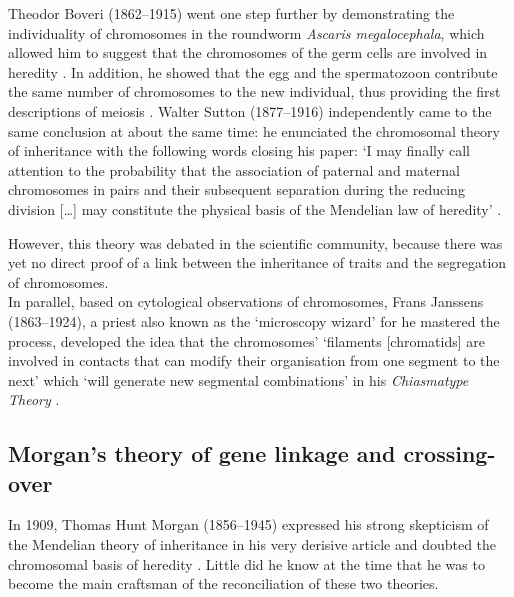 Theodor Boveri (1862--1915) went one step further by demonstrating the individuality of chromosomes in the roundworm \textit{Ascaris megalocephala}, which allowed him to suggest that the chromosomes of the germ cells are involved in heredity \citep{boveri1888zellen}.
In addition, he showed that the egg and the spermatozoon contribute the same number of chromosomes to the new individual, thus providing the first descriptions of meiosis \citep{boveri1890zellen}.
Walter Sutton (1877--1916) independently came to the same conclusion at about the same time: he enunciated the chromosomal theory of inheritance with the following words closing his  paper: ‘I may finally call attention to the probability that the association of paternal and maternal chromosomes in pairs and their subsequent separation during the reducing division […] may constitute the physical basis of the Mendelian law of heredity’ \citep{sutton1902morphology}.

However, this theory was debated in the scientific community, because there was yet no direct proof of a link between the inheritance of traits and the segregation of chromosomes.\\ 

In parallel, based on cytological observations of chromosomes, Frans Janssens (1863--1924), a priest also known as the ‘microscopy wizard’ for he mastered the process, developed the idea that the chromosomes' ‘filaments [chromatids] are involved in contacts that can modify their organisation from one segment to the next’ which ‘will generate new segmental combinations’ in his \textit{Chiasmatype Theory} \citep{janssens1909theorie}.



\subsection{Morgan's theory of gene linkage and crossing-over}
% 
In 1909, Thomas Hunt Morgan (1856--1945) expressed his strong skepticism of the Mendelian theory of inheritance in his very derisive article \textit{} \citep{morgan1909factors} and doubted the chromosomal basis of heredity \citep[reviewed in][]{koszul2012centenary}.
Little did he know at the time that he was to become the main craftsman of the reconciliation of these two theories.\\




